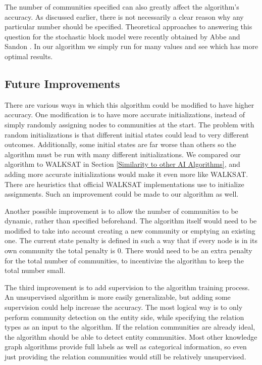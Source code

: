 \documentclass[12pt]{article}
\begin{document}
The number of communities specified can also greatly affect the algorithm's
accuracy. As discussed earlier, there is not necessarily a clear reason why any
particular number should be specified. Theoretical approaches to answering this
question for the stochastic block model were recently obtained by Abbe and
Sandon \cite{Abbe2015-1, Abbe2015-2}. In our algorithm we simply run for many
values and see which has more optimal results.

\subsection{Future Improvements}
\label{Future Improvements}

There are various ways in which this algorithm could be modified to have higher
accuracy. One modification is to have more accurate initializations, instead of
simply randomly assigning nodes to communities at the start. The problem with
random initializations is that different initial states could lead to very
different outcomes. Additionally, some initial states are far worse than others
so the algorithm must be run with many different initializations. We compared
our algorithm to WALKSAT in Section \ref{Similarity to other AI Algorithms}, and
adding more accurate initializations would make it even more like WALKSAT. There
are heuristics that official WALKSAT implementations use to initialize
assignments. Such an improvement could be made to our algorithm as well.

Another possible improvement is to allow the number of communities to be dynamic,
rather than specified beforehand. The algorithm itself would need to be modified
to take into account creating a new community or emptying an existing one. The
current state penalty is defined in such a way that if every node is in its own
community the total penalty is 0. There would need to be an extra penalty for
the total number of communities, to incentivize the algorithm to keep the
total number small.

The third improvement is to add supervision to the algorithm training process.
An unsupervised algorithm is more easily generalizable, but adding some
supervision could help increase the accuracy. The most logical way is to only
perform community detection on the entity side, while specifying the relation
types as an input to the algorithm. If the relation communities are already
ideal, the algorithm should be able to detect entity communities. Most other
knowledge graph algorithms \cite{Nickel2011, Guo2015, Chang2014} provide full
labels as well as categorical information, so even just providing the relation
communities would still be relatively unsupervised.
\end{document}
